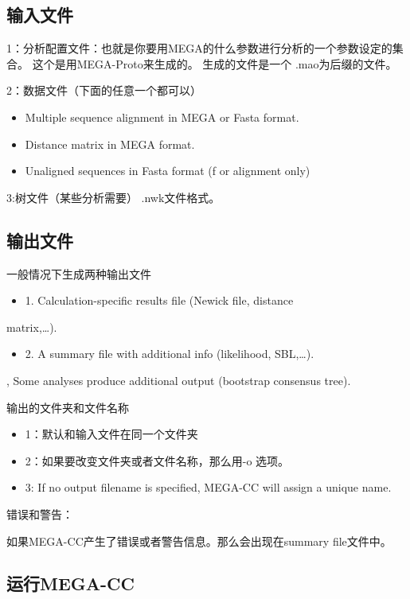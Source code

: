 \documentclass{ctexart}
\begin{document}
\subsection{输入文件}
\label{sec-3-2}

1：分析配置文件：也就是你要用MEGA的什么参数进行分析的一个参数设定的集合。
这个是用MEGA-Proto来生成的。
生成的文件是一个 .mao为后缀的文件。

2：数据文件（下面的任意一个都可以）
\begin{itemize}
\item Multiple sequence alignment in MEGA or Fasta format.
\item Distance matrix in MEGA format.
\item Unaligned sequences in Fasta format (f or alignment only)
\end{itemize}

3:树文件（某些分析需要） .nwk文件格式。
\subsection{输出文件}
\label{sec-3-3}

一般情况下生成两种输出文件

\begin{itemize}
\item 1. Calculation-specific results file (Newick file, distance
\end{itemize}
  matrix,…). 
\begin{itemize}
\item 2. A summary file with additional info (likelihood, SBL,…).
\end{itemize}
  , Some analyses produce additional output (bootstrap consensus 
  tree).
 
输出的文件夹和文件名称

\begin{itemize}
\item 1：默认和输入文件在同一个文件夹
\item 2：如果要改变文件夹或者文件名称，那么用-o 选项。
\item 3: If no output filename is specified, MEGA-CC will assign a unique 
  name.
\end{itemize}

错误和警告：

如果MEGA-CC产生了错误或者警告信息。那么会出现在summary file文件中。
\subsection{运行MEGA-CC}
\label{sec-3-4}
\end{document}

